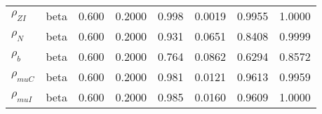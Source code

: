 \begin{center}
\begin{longtable}{llcccccc}
${\rho_{ZI}}$ & beta &   0.600 & 0.2000 &   0.998& 0.0019 &  0.9955 &  1.0000 \\ 
${\rho_N}$ & beta &   0.600 & 0.2000 &   0.931& 0.0651 &  0.8408 &  0.9999 \\ 
${\rho_b}$ & beta &   0.600 & 0.2000 &   0.764& 0.0862 &  0.6294 &  0.8572 \\ 
${\rho_{muC}}$ & beta &   0.600 & 0.2000 &   0.981& 0.0121 &  0.9613 &  0.9959 \\ 
${\rho_{muI}}$ & beta &   0.600 & 0.2000 &   0.985& 0.0160 &  0.9609 &  1.0000 \\ 
\end{longtable}
 \end{center}
